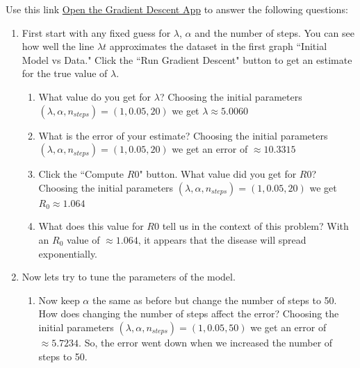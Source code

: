 \documentclass[11pt]{article}
\begin{document}
\vspace{0.5cm}



Use this link \href{https://woodword0-gradientdescentapplication2.hf.space/}{Open the Gradient Descent App} to answer the following questions:
\begin{enumerate}
\item First start with any fixed guess for $\lambda$, $\alpha$ and the number of steps. You can see how well the line $\lambda t$ approximates the dataset in the first graph ``Initial Model vs Data." Click the ``Run Gradient Descent" button to get an estimate for the true value of $\lambda$. 
    \begin{enumerate}
    \item[(a)] What value do you get for $\lambda$? 
    {\color{blue}
    Choosing the initial parameters $(\lambda , \alpha , n_{steps}) = (1,0.05,20)$ we get $\lambda \approx 5.0060$
    }
    
    \item[(b)] What is the error of your estimate?
       {\color{blue}
    Choosing the initial parameters $(\lambda , \alpha , n_{steps}) = (1,0.05,20)$ we get an error of  $\approx 10.3315$
    }
    \vspace{3cm}

    \item[(c)] Click the ``Compute $R0$" button. What value did you get for $R0$?
       {\color{blue}
    Choosing the initial parameters $(\lambda , \alpha , n_{steps}) = (1,0.05,20)$ we get $R_0 \approx 1.064$
    }
    \vspace{3cm}

    \item[(d)]  What does this value for $R0$ tell us in the context of this problem?
       {\color{blue}
    With an $R_0$ value of $\approx 1.064$, it appears that the disease will spread exponentially.
    }
    \vspace{3cm}




        \end{enumerate}

\item Now lets try to tune the parameters of the model.
\begin{enumerate}
\item[(a)] Now keep $\alpha$ the same as before but change the number of steps to 50. How does changing the number of steps affect the error?
{\color{blue}
    Choosing the initial parameters $(\lambda , \alpha , n_{steps}) = (1,0.05,50)$ we get an error of $\approx 5.7234$. So, the error went down when we increased the number of steps to 50.
    }
\vspace{4cm}


\end{enumerate}
\end{enumerate}
\end{document}
